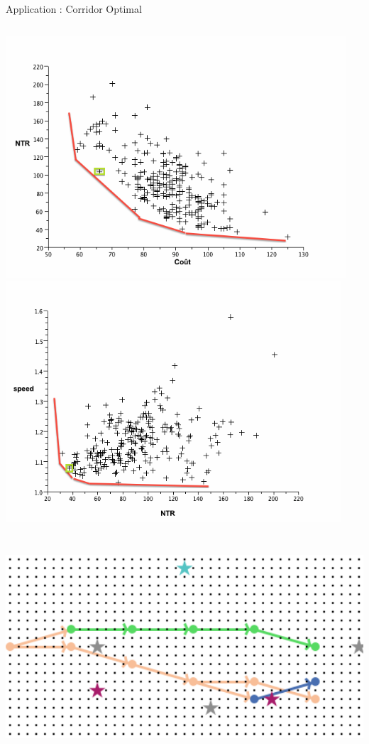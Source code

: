 \documentclass{beamer}
\begin{document}
\begin{frame}{}
\begin{columns}[t]
\begin{column}{.49\textwidth}
\begin{block}{Application : Corridor Optimal}
\begin{columns}[t]
\begin{column}{.95\textwidth}
\begin{justify}
          \centering
          \includegraphics[width=0.33\columnwidth,height=9cm]{figures/implantationcntr}
          \includegraphics[width=0.33\columnwidth,height=9cm]{figures/implantationntrspeed}
          \includegraphics[width=0.33\columnwidth,height=9cm]{figures/paretosimplantation}
          

\end{justify}
\end{column}
\end{columns}
\end{block}
\end{column}
\end{columns}
\end{frame}
\end{document}
